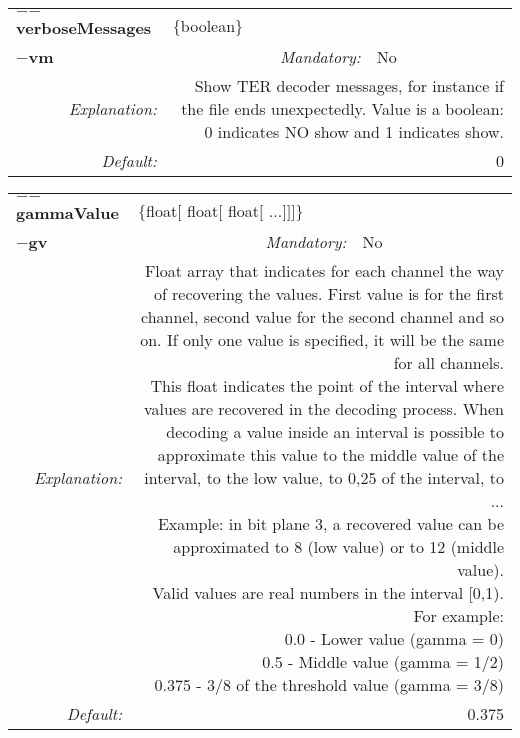 \begin{center}\begin{tabular}{|rr|rlrl|}
\hline
\multicolumn{2}{|l|}{\textbf{$-$$-$verboseMessages}} & \multicolumn{4}{|l|}{$\{$boolean$\}$} \\
\cline{3-6}
\multicolumn{2}{|l|}{\textbf{$-$vm}} & \emph{Mandatory:} & No & &  \\
\hline
\emph{Explanation:} & \multicolumn{5}{|p{12cm}|}{Show TER decoder messages, for instance if the file ends unexpectedly. Value is a boolean: 0 indicates NO show and 1 indicates show.} \\
\hline
\emph{Default:} & \multicolumn{5}{|p{12cm}|}{0 } \\
\hline
\end{tabular}\end{center}
\begin{center}\begin{tabular}{|rr|rlrl|}
\hline
\multicolumn{2}{|l|}{\textbf{$-$$-$gammaValue}} & \multicolumn{4}{|l|}{$\{$float$[$ float$[$ float$[$ ...$]$$]$$]$$\}$} \\
\cline{3-6}
\multicolumn{2}{|l|}{\textbf{$-$gv}} & \emph{Mandatory:} & No & &  \\
\hline
\emph{Explanation:} & \multicolumn{5}{|p{12cm}|}{Float array that indicates for each channel the way of recovering the values. First value is for the first channel, second value for the second channel and so on. If only one value is specified, it will be the same for all channels.\newline This float indicates the point of the interval where values are recovered in the decoding process. When decoding a value inside an interval is possible to approximate this value to the middle value of the interval, to the low value, to 0,25 of the interval, to ... \newline Example: in bit plane 3, a recovered value can be approximated to 8 (low value) or to 12 (middle value). \newline Valid values are real numbers in the interval [0,1). \newline For example: \newline   0.0 - Lower value (gamma = 0) \newline   0.5 - Middle value (gamma = 1/2) \newline   0.375 - 3/8 of the threshold value (gamma = 3/8)} \\
\hline
\emph{Default:} & \multicolumn{5}{|p{12cm}|}{0.375 } \\
\hline
\end{tabular}\end{center}
